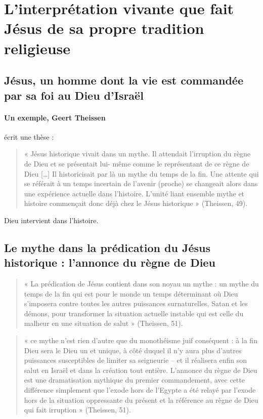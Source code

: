 
 \section{L’interprétation vivante que fait Jésus de sa propre tradition religieuse}
\subsection{Jésus, un homme dont la vie est commandée par sa foi au Dieu d’Israël}

\paragraph{Un exemple, Geert Theissen} écrit une thèse : 
\begin{quote}
« Jésus historique vivait dans un mythe. Il attendait l'irruption du
règne de Dieu et se présentait lui- même comme le représentant de ce
règne de Dieu {[}\ldots{]} Il historicisait par là un mythe du temps de
la fin. Une attente qui se référait à un temps incertain de l'avenir
(proche) se changeait alors dans une expérience actuelle dans
l'histoire. L'unité liant ensemble mythe et histoire commençait donc
déjà chez le Jésus historique » (Theissen, 49).
\end{quote}

\begin{Def}[mythe]
Dieu intervient dans l'histoire.
\end{Def}

\subsection{Le mythe dans la prédication du Jésus historique : l’annonce du règne de Dieu}
\begin{quote}
    

« La prédication de Jésus contient dans son noyau un mythe : un mythe du
temps de la fin qui est pour le monde un temps déterminant où Dieu
s'imposera contre toutes les autres puissances surnaturelles, Satan et
les démons, pour transformer la situation actuelle instable qui est
celle du malheur en une situation de salut » (Theissen, 51).
\end{quote}

\begin{quote}
    « ce mythe n'est rien d'autre que du monothéisme juif conséquent : à la
fin Dieu sera le Dieu un et unique, à côté duquel il n'y aura plus
d'autres puissances susceptibles de limiter sa seigneurie -- et il
réalisera enfin son salut en Israël et dans la création tout entière.
L'annonce du règne de Dieu est une dramatisation mythique du premier
commandement, avec cette différence simplement que l'exode hors de
l'Egypte a été relayé par l'exode hors de la situation oppressante du
présent et la référence au règne de Dieu qui fait irruption » (Theissen,
51).
\end{quote}


